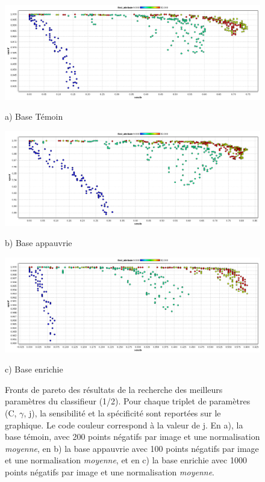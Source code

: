 \begin{figure}[h!]
\begin{center}
 \includegraphics[width=14cm]{images/pareto_param_200.png}

{\small a) Base Témoin}
\vspace{0.5cm}

\includegraphics[width=14cm]{images/pareto_param_100.png}

{\small b) Base appauvrie}

 \includegraphics[width=14cm]{images/pareto_param_1000.png}
 
{\small c) Base enrichie}

\end{center}
 \caption{Fronts de pareto des résultats de la recherche des meilleurs paramètres du classifieur (1/2). Pour chaque triplet de paramètres (C, $\gamma$, j), la sensibilité et la spécificité sont reportées sur le graphique. Le code couleur correspond à la valeur de j. En a), la base témoin, avec 200 points négatifs par image et une normalisation \emph{moyenne}, en b) la base appauvrie avec 100 points négatifs par image et une normalisation \emph{moyenne}, et en c) la base enrichie avec 1000 points négatifs par image et une normalisation \emph{moyenne}.}
\label{fig:paretoParams1}
\end{figure}



